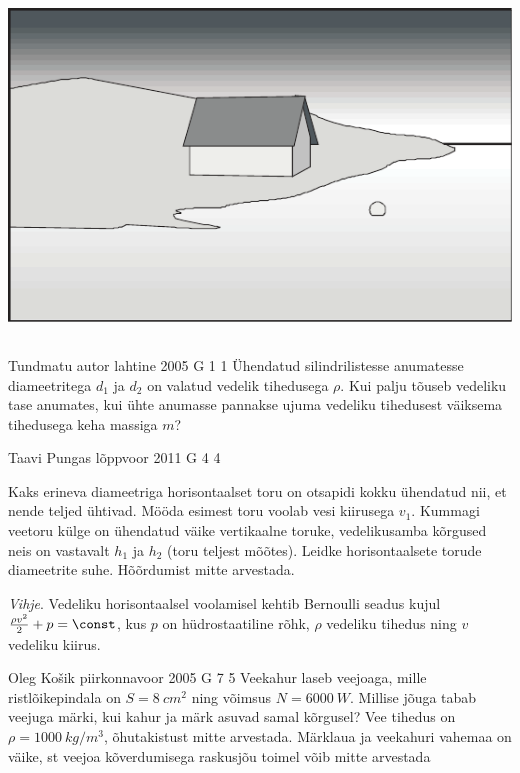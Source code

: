 \documentclass[11pt, twoside]{article}
\begin{document}
{{\begin{center}
	\includegraphics[width=0.9\linewidth]{2008-lahg-09-yl}
\end{center}
\fi
}
\newpage\subsection{\protect{}}

{Tundmatu autor} %
{lahtine} %
{2005} %
{G 1} %
{1} %
{
\ifStatement
Ühendatud silindrilistesse anumatesse diameetritega $d_1$ ja $d_2$ on valatud vedelik tihedusega $\rho$. Kui palju tõuseb vedeliku tase anumates, kui ühte anumasse pannakse ujuma vedeliku tihedusest väiksema tihedusega keha massiga $m$?
\fi
}

{Taavi Pungas} %
{lõppvoor} %
{2011} %
{G 4} %
{4} %
{
\ifStatement
Kaks erineva diameetriga horisontaalset toru on otsapidi
kokku ühendatud nii, et nende teljed ühtivad. Mööda esimest toru voolab vesi
kiirusega $v_1$. Kummagi veetoru külge on ühendatud väike vertikaalne toruke,
vedelikusamba kõrgused neis on vastavalt $h_1$ ja $h_2$ (toru teljest mõõtes). Leidke
horisontaalsete torude diameetrite suhe. Hõõrdumist mitte arvestada. 

\emph{Vihje}. 
Vedeliku horisontaalsel voolamisel kehtib Bernoulli seadus kujul $\frac{\rho v^2}{2}+p=\const$, kus $p$ on hüdrostaatiline rõhk, $ρ$ vedeliku tihedus ning $v$ vedeliku kiirus.
\fi
}

{Oleg Košik} %
{piirkonnavoor} %
{2005} %
{G 7} %
{5} %
{
\ifStatement
Veekahur laseb veejoaga, mille ristlõikepindala on $S = \SI{8}{cm^2}$ ning võimsus $N = \SI{6000}{W}$. Millise jõuga tabab veejuga märki, kui kahur ja märk asuvad samal kõrgusel? Vee tihedus on $\rho = \SI{1000}{kg/m^3}$, õhutakistust mitte arvestada. Märklaua ja veekahuri vahemaa on väike, st veejoa kõverdumisega raskusjõu toimel võib mitte arvestada
\fi
}

}
\end{document}

